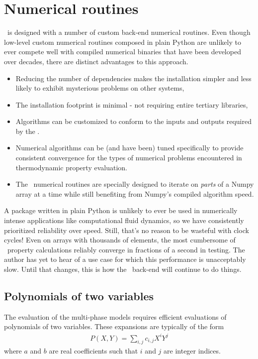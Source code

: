 \chapter{Numerical routines}\label{ch:num}

\PM\ is designed with a number of custom back-end numerical routines.  Even though low-level custom numerical routines composed in plain Python are unlikely to ever compete well with compiled numerical binaries that have been developed over decades, there are distinct advantages to this approach.
\begin{itemize}
\item Reducing the number of dependencies makes the installation simpler and less likely to exhibit mysterious problems on other systems,
\item The installation footprint is minimal - not requiring entire tertiary libraries,
\item Algorithms can be customized to conform to the inputs and outputs required by the \PM.
\item Numerical algorithms can be (and have been) tuned specifically to provide consistent convergence for the types of numerical problems encountered in thermodynamic property evaluation.
\item The \PM\ numerical routines are specially designed to iterate on \emph{parts} of a Numpy array at a time while still benefiting from Numpy's compiled algorithm speed.
\end{itemize}

A package written in plain Python is unlikely to ever be used in numerically intense applications like computational fluid dynamics, so we have consistently prioritized reliability over speed.  Still, that's no reason to be wasteful with clock cycles!  Even on arrays with thousands of elements, the most cumbersome of \PM\ property calculations reliably converge in fractions of a second in testing.  The author has yet to hear of a use case for which this performance is unacceptably slow.  Until that changes, this is how the \PM\ back-end will continue to do things.

%
%
\section{Polynomials of two variables}\label{sec:num:poly2}
The evaluation of the multi-phase models requires efficient evaluations of polynomials of two variables.  These expansions are typically of the form
\begin{align}
P(X,Y) = \sum_{i,j} c_{i,j} X^i Y^j\label{eqn:num:PXY}
\end{align}
where $a$ and $b$ are real coefficients such that $i$ and $j$ are integer indices. 

